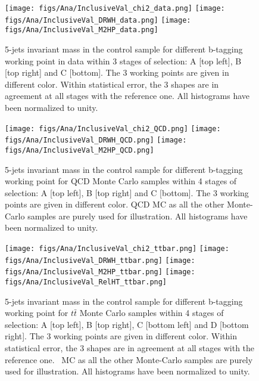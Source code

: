 \begin{figure}[!Hhtbp]
  \begin{center}
    \texttt{[image: figs/Ana/InclusiveVal\_chi2\_data.png]}
    \texttt{[image: figs/Ana/InclusiveVal\_DRWH\_data.png]}
    \texttt{[image: figs/Ana/InclusiveVal\_M2HP\_data.png]}
    \caption{5-jets invariant mass in the control sample for different b-tagging working point in data within 3 stages of selection: A [top left], B [top right] and C [bottom]. The 3 working points are given in different color. Within statistical error, the 3 shapes are in agreement at all stages with the reference one. All histograms have been normalized to unity.}
    \label{fig:StageWPData}
  \end{center}
\end{figure}

\begin{figure}[!Hhtbp]
  \begin{center}
    \texttt{[image: figs/Ana/InclusiveVal\_chi2\_QCD.png]}
    \texttt{[image: figs/Ana/InclusiveVal\_DRWH\_QCD.png]}
    \texttt{[image: figs/Ana/InclusiveVal\_M2HP\_QCD.png]}
    \caption{5-jets invariant mass in the control sample for different b-tagging working point for QCD Monte Carlo samples within 4 stages of selection: A [top left], B [top right] and C [bottom]. The 3 working points are given in different color. QCD MC as all the other Monte-Carlo samples are purely used for illustration. All histograms have been normalized to unity.}
    \label{fig:StageWPQCD}
  \end{center}
\end{figure}

\begin{figure}[!Hhtbp]
  \begin{center}
    \texttt{[image: figs/Ana/InclusiveVal\_chi2\_ttbar.png]}
    \texttt{[image: figs/Ana/InclusiveVal\_DRWH\_ttbar.png]}
    \texttt{[image: figs/Ana/InclusiveVal\_M2HP\_ttbar.png]}
    \texttt{[image: figs/Ana/InclusiveVal\_RelHT\_ttbar.png]}
    \caption{5-jets invariant mass in the control sample for different b-tagging working point for $t\bar{t}$ Monte Carlo samples within 4 stages of selection: A [top left], B [top right], C [bottom left] and D [bottom right]. The 3 working points are given in different color. Within statistical error, the 3 shapes are in agreement at all stages with the reference one. \ttbar~MC as all the other Monte-Carlo samples are purely used for illustration. All histograms have been normalized to unity.}
    \label{fig:StageWPttbar}
  \end{center}
\end{figure}

